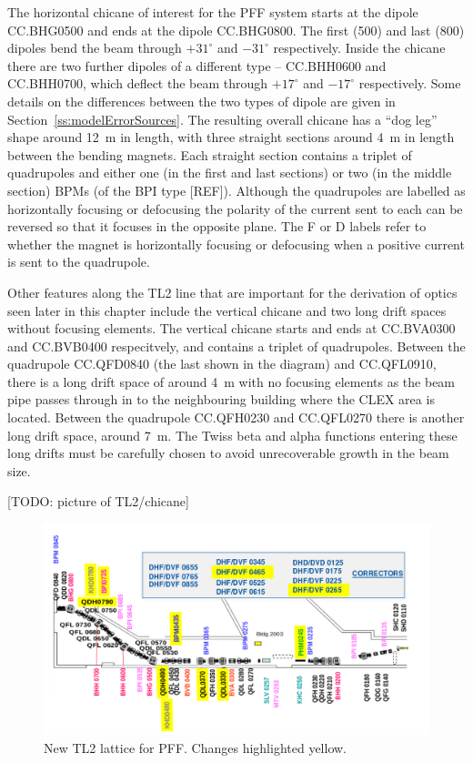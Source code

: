 The horizontal chicane of interest for the PFF system starts at the dipole CC.BHG0500 and ends at the dipole CC.BHG0800. The first (500) and last (800) dipoles bend the beam through \(+31^\circ\) and \(-31^\circ\) respectively. Inside the chicane there are two further dipoles of a different type -- CC.BHH0600 and CC.BHH0700, which deflect the beam through \(+17^\circ\) and \(-17^\circ\) respectively. Some details on the differences between the two types of dipole are given in Section~\ref{ss:modelErrorSources}. The resulting overall chicane has a ``dog leg'' shape around 12~m in length, with three straight sections around 4~m in length between the bending magnets. Each straight section contains a triplet of quadrupoles and either one (in the first and last sections) or two (in the middle section) BPMs (of the BPI type [REF]). Although the quadrupoles are labelled as horizontally focusing or defocusing the polarity of the current sent to each can be reversed so that it focuses in the opposite plane. The F or D labels refer to whether the magnet is horizontally focusing or defocusing when a positive current is sent to the quadrupole.

Other features along the TL2 line that are important for the derivation of optics seen later in this chapter include the vertical chicane and two long drift spaces without focusing elements. The vertical chicane starts and ends at CC.BVA0300 and CC.BVB0400 respecitvely, and contains a triplet of quadrupoles. Between the quadrupole CC.QFD0840 (the last shown in the diagram) and CC.QFL0910, there is a long drift space of around 4~m with no focusing elements as the beam pipe passes through in to the neighbouring building where the CLEX area is located. Between the quadrupole CC.QFH0230 and CC.QFL0270 there is another long drift space, around 7~m. The Twiss beta and alpha functions entering these long drifts must be carefully chosen to avoid unrecoverable growth in the beam size.

[TODO: picture of TL2/chicane]

\begin{landscape}
\begin{figure}
  \centering
  \includegraphics[width=\hsize]{Figures/optics/newTL2Lattice}
  \caption{New TL2 lattice for PFF. Changes highlighted yellow.}
  \label{f:newTL2Lattice}
\end{figure}
\end{landscape}


